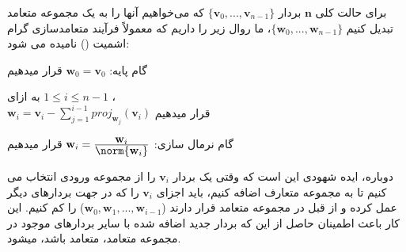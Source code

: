 {\begin{spacing}{1.5}
        برای حالت کلی $\textbf{n}$ بردار $\{\textbf{v}_{0},...,\textbf{v}_{n-1}\}$ که می‌خواهیم آنها را به یک مجموعه متعامد تبدیل کنیم $\{\textbf{w}_{0},...,\textbf{w}_{n-1}\}$، ما روال زیر را داریم که معمولاً فرآیند متعامدسازی گرام اشمیت () نامیده می شود:

        \begin{center}
            گام پایه: $\textbf{w}_{0}=\textbf{v}_{0}$ قرار میدهیم

            به ازای $1\leq i\leq n-1$ ، \\ $\textbf{w}_{i}=\textbf{v}_{i}-\sum\limits_{j=1}^{i-1}proj_{\textbf{w}_{j}}(\textbf{v}_{i})$ قرار میدهیم

            گام نرمال سازی: $\textbf{w}_{i}=\frac{\displaystyle\textbf{w}_{i}}{\displaystyle\norm{\textbf{w}_{i}}}$ قرار میدهیم
        \end{center}

        دوباره، ایده شهودی این است که وقتی یک بردار $\textbf{v}_{i}$ را از مجموعه ورودی انتخاب می کنیم تا به مجموعه متعارف اضافه کنیم،
        باید اجزای $\textbf{v}_{i}$ را که در جهت بردارهای دیگر عمل کرده و از قبل در مجموعه متعامد قرار دارند ($\textbf{w}_{0},\textbf{w}_{1},...,\textbf{w}_{i-1}$) را کم کنیم.
        این کار باعث اطمینان حاصل از این که بردار جدید اضافه شده با سایر بردارهای موجود در مجموعه متعامد، متعامد باشد، میشود.
    \end{spacing}
}


